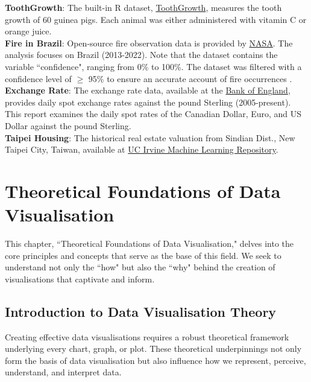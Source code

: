 \documentclass{article}\usepackage[]{graphicx}\usepackage[]{xcolor}
\numberwithin{equation}{section}
\begin{document}
\noindent
\textbf{ToothGrowth}: The built-in R dataset, \href{https://www.rdocumentation.org/packages/datasets/versions/3.6.2/topics/ToothGrowth}{ToothGrowth}, measures the tooth growth of 60 guinea pigs. Each animal was either administered with vitamin C or orange juice.\\

\noindent
\textbf{Fire in Brazil}: Open-source fire observation data is provided by \href{https://firms.modaps.eosdis.nasa.gov/}{NASA}. The analysis focuses on Brazil (2013-2022). Note that the dataset contains the variable ``confidence", ranging from 0\% to 100\%. The dataset was filtered with a confidence level of $\ge$ 95\%  to ensure an accurate account of fire occurrences \cite{nasa_confidence}.\\

\noindent
\textbf{Exchange Rate}: The exchange rate data, available at the \href{https://www.bankofengland.co.uk/boeapps/database/index.asp?first=yes&SectionRequired=I&HideNums=-1&ExtraInfo=true&Travel=NIx}{Bank of England}, provides daily spot exchange rates against the pound Sterling (2005-present). This report examines the daily spot rates of the Canadian Dollar, Euro, and US Dollar against the pound Sterling.\\

\noindent
\textbf{Taipei Housing}: The historical real estate valuation from Sindian Dist., New Taipei City, Taiwan,  available at \href{https://archive.ics.uci.edu/dataset/477/real+estate+valuation+data+set}{UC Irvine Machine Learning Repository}.

\newpage 

\section{Theoretical Foundations of Data Visualisation}
This chapter, ``Theoretical Foundations of Data Visualisation," delves into the core principles and concepts that serve as the base of this field. We seek to understand not only the ``how" but also the ``why" behind the creation of visualisations that captivate and inform.

\subsection{Introduction to Data Visualisation Theory}
Creating effective data visualisations requires a robust theoretical framework underlying every chart, graph, or plot. These theoretical underpinnings not only form the basis of data visualisation but also influence how we represent, perceive, understand, and interpret data.\\ 
\end{document}
